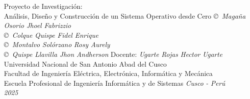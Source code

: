 \documentclass[letterpaper,12pt]{report}
\begin{document}

\thesistitle
{Proyecto de Investigación: \\
	Análisis, Diseño y Construcción de un Sistema Operativo desde Cero}
{\emph{\copyright\ Magaña Osorio Jhoel Fabrizzio}\\
	\emph{\copyright\ Colque Quispe Fidel Enrique}\\
	\emph{\copyright\ Montalvo Sol\'orzano Rosy Aurely}\\
	\emph{\copyright\ Quispe Llavilla Jhon Andherson}}
{Docente: \emph{Ugarte Rojas Hector Ugarte}}
{Universidad Nacional de San Antonio Abad del Cusco\\
	Facultad de Ingeniería Eléctrica, Electrónica, Informática y Mecánica \\
	Escuela Profesional de Ingeniería Informática y de Sistemas}
{\emph{Cusco - Perú\\2025}}

















% 
\end{document}
